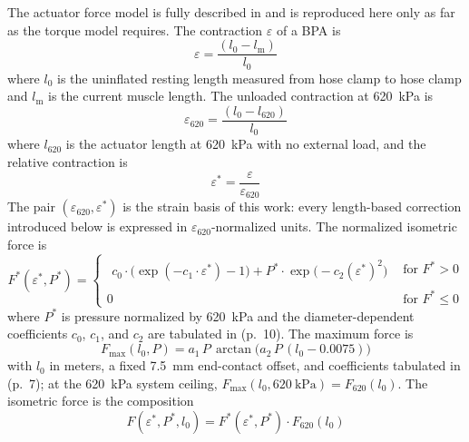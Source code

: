 The actuator force model is fully described in \citet{bolen_2026} and is reproduced here only as far as the torque model requires. The contraction $\varepsilon$ of a BPA is
\begin{equation}
    {\varepsilon} = \frac{(l_{0}-l_\text{m})}{l_{0}} \label{eq:strain}
\end{equation}
where $l_{0}$ is the uninflated resting length measured from hose clamp to hose clamp and $l_\text{m}$ is the current muscle length. The unloaded contraction at \qty{620}{\kPa} is
\begin{equation}
    \varepsilon_{620} = \frac{(l_{0}-l_{620})}{l_{0}} \label{eq:max_strain}
\end{equation}
where $l_{620}$ is the actuator length at \qty{620}{\kPa} with no external load, and the relative contraction is
\begin{equation}
    \varepsilon^* = \frac{\varepsilon}{\varepsilon_{620}} \label{eq:rel_strain}
\end{equation}
The pair $(\varepsilon_{620}, \varepsilon^*)$ is the strain basis of this work: every length-based correction introduced below is expressed in $\varepsilon_{620}$-normalized units. The normalized isometric force is
\begin{equation}
F^*(\varepsilon^*,P^*)=
\begin{cases}
\begin{aligned}
c_0\cdot\bigl(\exp(-c_1 \cdot \varepsilon^*)-1\bigr)
+ P^*\cdot\exp\!\bigl(-c_2(\varepsilon^*)^{2}\bigr)
\end{aligned}
& \text{for } F^*>0\\[10pt]
0
& \text{for } F^*\le 0
\end{cases}\label{eq:Fstar}
\end{equation}
where $P^*$ is pressure normalized by \qty{620}{\kPa} and the diameter-dependent coefficients $c_0$, $c_1$, and $c_2$ are tabulated in \citet{bolen_2026} (p.~10). The maximum force is
\begin{equation}
    F_{\mathrm{max}}(l_{0},P) = a_1 \, P \, \arctan\!\bigl(a_2 \, P \, (l_{0}-0.0075)\bigr) \label{eq:Fmax_3D}
\end{equation}
with $l_{0}$ in meters, a fixed \qty{7.5}{\mm} end-contact offset, and coefficients tabulated in \citet{bolen_2026} (p.~7); at the \qty{620}{\kPa} system ceiling, $F_{\mathrm{max}}(l_{0},\qty{620}{\kPa}) = F_{620}(l_{0})$. The isometric force is the composition
\begin{equation}
   F(\varepsilon^*,P^*,l_{0}) = F^*(\varepsilon^*,P^*) \cdot F_{620}(l_{0}) \label{eq:force}
\end{equation}

